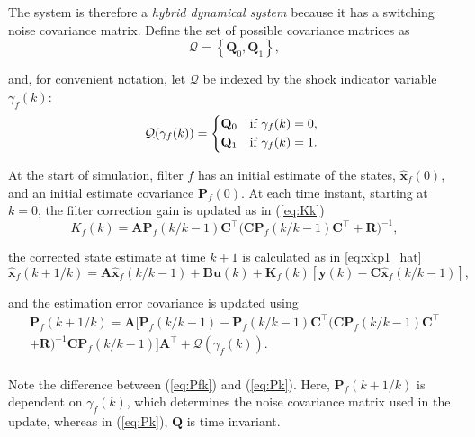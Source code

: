 The system is therefore a \textit{hybrid dynamical system} because it has a switching noise covariance matrix. Define the set of possible covariance matrices as
\begin{equation} \label{eq:init_Q_R}
	\mathcal{Q} = \left\{\mathbf{Q}_0, \mathbf{Q}_1\right\},
\end{equation}

and, for convenient notation, let $\mathcal{Q}$ be indexed by the shock indicator variable $\gamma_f(k)$:
\begin{equation} \label{eq:init_Q}
	\mathcal{Q}(\gamma_f(k)) = 
	\begin{cases*}
		\mathbf{Q}_0 & \text{if} $\gamma_f(k)=0$, \\
		\mathbf{Q}_1 & \text{if} $\gamma_f(k)=1$.
	\end{cases*}
\end{equation}

At the start of simulation, filter $f$ has an initial estimate of the states, $\mathbf{\hat{x}}_f(0)$, and an initial estimate covariance $\mathbf{P}_f(0)$. At each time instant, starting at $k=0$, the filter correction gain is updated as in (\ref{eq:Kk})
\begin{equation} \label{eq:Kf}
	K_f(k) = \mathbf{A}\mathbf{P}_f(k/k-1)\mathbf{C}^\intercal \big(\mathbf{C}\mathbf{P}_f(k/k-1)\mathbf{C}^\intercal + \mathbf{R}\big)^{-1},
\end{equation}

the corrected state estimate at time $k+1$ is calculated as in \ref{eq:xkp1_hat}
\begin{equation} \label{eq:xfkp1_hat}
	\mathbf{\hat{x}}_f(k+1/k) = \mathbf{A} \mathbf{\hat{x}}_f(k/k-1) + \mathbf{B}\mathbf{u}(k) + 
	\mathbf{K}_f(k)\left[\mathbf{y}(k)-\mathbf{C} \mathbf{\hat{x}}_f(k/k-1)\right],
\end{equation}

and the estimation error covariance is updated using
\begin{multline} \label{eq:Pfk}
	\mathbf{P}_f(k+1/k) = \mathbf{A}\big[\mathbf{P}_f(k/k-1)
	- \mathbf{P}_f(k/k-1)\mathbf{C}^\intercal\big(\mathbf{C}\mathbf{P}_f(k/k-1)\mathbf{C}^\intercal \\ + 
	\mathbf{R}\big)^{-1}\mathbf{C}\mathbf{P}_f(k/k-1) \big]\mathbf{A}^\intercal + \mathcal{Q}(\gamma_f(k)). \\
\end{multline}

Note the difference between (\ref{eq:Pfk}) and (\ref{eq:Pk}).  Here, $\mathbf{P}_f(k+1/k)$ is dependent on $\gamma_f(k)$, which determines the noise covariance matrix used in the update, whereas in (\ref{eq:Pk}), $\mathbf{Q}$ is time invariant.

